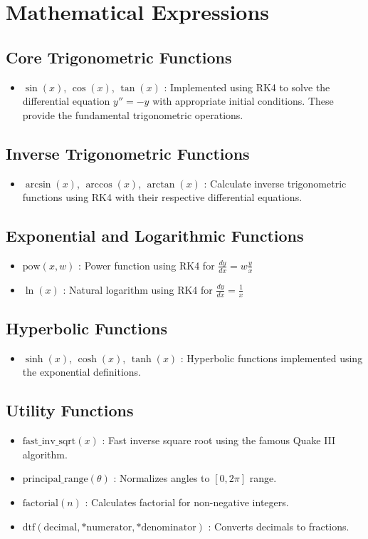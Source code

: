 \documentclass[journal]{IEEEtran}
\numberwithin{equation}{enumi}
\numberwithin{figure}{enumi}
\begin{document}
\section{Mathematical Expressions}
\subsection{Core Trigonometric Functions}
\begin{itemize}
    \item $\sin(x)$, $\cos(x)$, $\tan(x)$ : Implemented using RK4 to solve the differential equation $y'' = -y$ with appropriate initial conditions. These provide the fundamental trigonometric operations.
\end{itemize}

\subsection{Inverse Trigonometric Functions}
\begin{itemize}
    \item $\arcsin(x)$, $\arccos(x)$, $\arctan(x)$ : Calculate inverse trigonometric functions using RK4 with their respective differential equations.
\end{itemize}

\subsection{Exponential and Logarithmic Functions}
\begin{itemize}
    \item $\text{pow}(x, w)$ : Power function using RK4 for $\frac{dy}{dx} = w\frac{y}{x}$
    \item $\ln(x)$ : Natural logarithm using RK4 for $\frac{dy}{dx} = \frac{1}{x}$
\end{itemize}

\subsection{Hyperbolic Functions}
\begin{itemize}
    \item $\sinh(x)$, $\cosh(x)$, $\tanh(x)$ : Hyperbolic functions implemented using the exponential definitions.
\end{itemize}

\subsection{Utility Functions}
\begin{itemize}
    \item $\text{fast\_inv\_sqrt}(x)$ : Fast inverse square root using the famous Quake III algorithm.
    \item $\text{principal\_range}(\theta)$ : Normalizes angles to $[0, 2\pi]$ range.
    \item $\text{factorial}(n)$ : Calculates factorial for non-negative integers.
    \item $\text{dtf}(\text{decimal}, *\text{numerator}, *\text{denominator})$ : Converts decimals to fractions.
\end{itemize}
\end{document}
